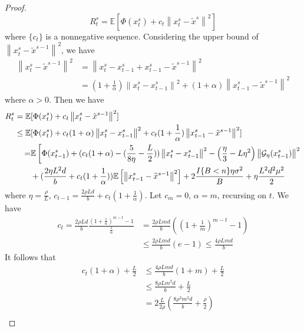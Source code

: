 \documentclass{article}
\newcommand*{\G}{\mathcal{G}}
\newcommand*{\E}{\mathbb{E}}
\newcommand{\norm}[1]{\left\lVert#1\right\rVert}
\theoremstyle{definition}
\theoremstyle{remark}
\begin{document}
\begin{proof}
{{\begin{equation}
 R_t^s = \E[\Phi(x_t^s) + c_t\norm{x_t^s - \tilde{x}^s}^2]
 \end{equation}
 where $\{c_t\}$ is a nonnegative sequence. Considering the upper bound of $\norm{x_{t}^s - \tilde{x}^{s-1}}^2$, we have
 \begin{equation}
 \begin{split}
  \norm{x_{t}^s - \tilde{x}^{s-1}}^2 & = \norm{x_{t}^s - x_{t-1}^s + x_{t-1}^s - \tilde{x}^{s-1}}^2 \\
  & = (1+\frac{1}{\alpha}) \norm{x_{t}^s - x_{t-1}^s}^2 + (1+\alpha) \norm{x_{t-1}^s - \tilde{x}^{s-1}}^2
 \end{split}
 \end{equation}
 where $\alpha > 0$. Then we have 
 \begin{align} 
R_t^s = \E&[\Phi({x}_{t}^s) + c_t \norm{x_{t}^s - \tilde{x}^{s-1}}^2] \notag\\
\leq \E&[\Phi({x}_{t}^s) + c_t (1+{\alpha}) \norm{x_{t}^s - x_{t-1}^s}^2 + c_t (1+\frac{1}{\alpha}) \norm{x_{t-1}^s - \tilde{x}^{s-1}}^2]\\
=& \E\left[\Phi({x}_{t-1}^s)  + (c_t (1+{\alpha})-(\frac{5}{8\eta} - \frac{L}{2}))\norm{{x}_t^s-x_{t-1}^s}^2- \left(\frac{\eta}{3}-L\eta^2\right)\norm{\G_{\eta}(x_{t-1}^s)}^2 \right. \\
&+ (\frac{2\eta L^2 d}{b}+c_t (1+\frac{1}{\alpha}))\E\left[\norm{x_{t-1}^s-\widetilde{x}^{s-1}}^2\right]+ 2\frac{I\{B < n\}\eta \sigma ^2}{B}+\eta \frac{L^2 d^2 \mu^2}{2}
 \end{align}
 where $\eta = \frac{\rho}{L}$, $c_{t-1} = \frac{2\rho L d}{b}+c_t (1+\frac{1}{\alpha})$. Let $c_m=0$, $\alpha = m$, recursing on $t$. We have 
 \begin{equation}
 \begin{split}
 c_t = \frac{2\rho L d}{b}\frac{(1+\frac{1}{\alpha})^{m-t}-1}{\frac{1}{\alpha}} &= \frac{2\rho Lm d}{b} \left((1+\frac{1}{m})^{m-t}-1\right)\\
 &\leq \frac{2\rho Lm d}{b} (e-1) \leq \frac{4\rho Lmd}{b}
 \end{split}
 \end{equation}
 It follows that 
 \begin{equation}
 \begin{split}
 c_t (1+{\alpha})  + \frac{L}{2} & \leq \frac{4\rho Lmd}{b} (1+m) + \frac{L}{2}\\
 & \leq \frac{8\rho L m^2d}{b} + \frac{L}{2} \\
 & = 2\frac{L}{2\rho} (\frac{8\rho^2 m^2 d}{b} + \frac{\rho}{2})\\

\end{split}
\end{equation}}}
\end{proof}
\end{document}
